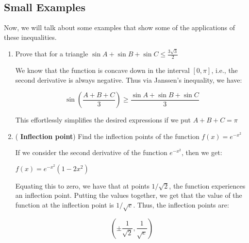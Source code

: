 \subsection{Small Examples}

Now, we will talk about some examples that show some of the applications of these inequalities.

\begin{enumerate}
    \item Prove that for a triangle $\sin A + \sin B + \sin C \leq \frac{3\sqrt{3}}{2}$

    We know that the function is concave down in the interval $[0, \pi]$, i.e., the second derivative is always negative. Thus via Janssen's inequality, we have:

    $$\sin(\frac{A+B+C}{3}) \geq \frac{\sin A + \sin B + \sin C}{3}$$

    This effortlessly simplifies the desired expressions if we put $A+B+C=\pi$


    \item (\textbf{ Inflection point}) Find the inflection points of the function $f(x)=e^{-x^2}$\\

    \begin{outline}
        If we consider the second derivative of the function $e^{-x^2}$, then we get:

        $f(x)=e^{-x^2}(1-2x^2)$

        Equating this to zero, we have that at points $1/\sqrt{2}$, the function experiences an inflection point. Putting the values together, we get that the value of the function at the inflection point is $1/\sqrt{e}$. Thus, the inflection points are:

        $$(\pm \frac{1}{\sqrt{2}}, \frac{1}{\sqrt{e}})$$
    \end{outline}


    
\end{enumerate}

